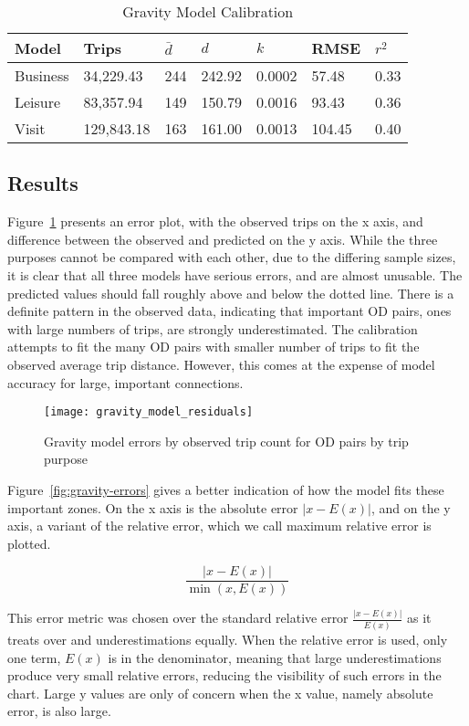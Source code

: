 \begin{table}[H]
\centering
\caption{Gravity Model Calibration}
\label{table:gravity-calibration}
\begin{tabular}{@{}lllllll@{}}
\toprule
Model & Trips & $\bar{d}$ & $d$ & $k$ & RMSE & $r^2$ \\ \midrule
   Business  & 34,229.43  &     244     &  242.92   & 0.0002 & 57.48  & 0.33  \\
   Leisure   & 83,357.94  &     149     &  150.79   & 0.0016 & 93.43  & 0.36  \\
   Visit     & 129,843.18 &     163     &  161.00   & 0.0013 & 104.45 & 0.40  \\ \bottomrule
\end{tabular}
\end{table}


\subsection{Results}
Figure~\ref{fig:gravity-residuals} presents an error plot, with the observed trips on the x axis, and difference between the observed and predicted on the y axis. While the three purposes cannot be compared with each other, due to the differing sample sizes, it is clear that all three models have serious errors, and are almost unusable. The predicted values should fall roughly above and below the dotted line. There is a definite pattern in the observed data, indicating that important OD pairs, ones with large numbers of trips, are strongly underestimated. The calibration attempts to fit the many OD pairs with smaller number of trips to fit the observed average trip distance. However, this comes at the expense of model accuracy for large, important connections.

\begin{figure}[H]
\centering
\texttt{[image: gravity\_model\_residuals]}
\caption{Gravity model errors by observed trip count for OD pairs by trip purpose}
\label{fig:gravity-residuals}
\end{figure}

Figure~\ref{fig:gravity-errors} gives a better indication of how the model fits these important zones. On the x axis is the absolute error $|x - E(x)|$, and on the y axis, a variant of the relative error, which we call maximum relative error is plotted. 

$$\frac{|x-E(x)|}{\min(x, E(x))}$$

This error metric was chosen over the standard relative error $\frac{|x-E(x)|}{E(x)}$ as it treats over and underestimations equally. When the relative error is used, only one term, $E(x)$ is in the denominator, meaning that large underestimations produce very small relative errors, reducing the visibility of such errors in the chart. Large y values are only of concern when the x value, namely absolute error, is also large.

